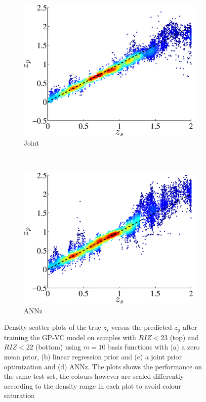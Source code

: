 \documentclass[useAMS,usenatbib,fleqn]{mn2e}
\begin{document}
\begin{figure}
\begin{subfigure}[b]{0.24\textwidth}
                \includegraphics[width=\textwidth]{figures/22_J.eps}
                \caption{Joint}
        \end{subfigure}
       ~
        \begin{subfigure}[b]{0.24\textwidth}
                \includegraphics[width=\textwidth]{figures/ANN_22.eps}
                \caption{{\sc ANNz}}
        \end{subfigure}
        
        \caption{Density scatter plots of the true $z_\textrm{s}$ versus the predicted $z_\textrm{p}$ after training the GP-VC model on samples with $RIZ<23$ (top) and $RIZ<22$ (bottom) using $m=10$ basis functions with (a) a zero mean prior, (b) linear regression prior and (c) a joint prior optimization and (d) {\sc ANNz}. The plots shows the performance on the same test set, the colours however are scaled differently according to the density range in each plot to avoid colour saturation}
        \label{fig-RIZ-splits}
\end{figure}
\end{document}

